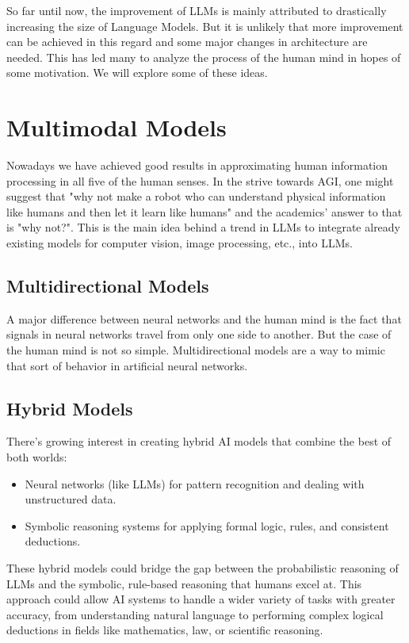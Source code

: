 So far until now, the improvement of LLMs is mainly attributed to drastically increasing the size of Language Models. But it is unlikely that more improvement can be achieved in this regard and some major changes in architecture are needed. This has led many to analyze the process of the human mind in hopes of some motivation. We will explore some of these ideas.

\section{Multimodal Models}
Nowadays we have achieved good results in approximating human information processing in all five of the human senses. In the strive towards AGI, one might suggest that "why not make a robot who can understand physical information like humans and then let it learn like humans" and the academics' answer to that is "why not?". This is the main idea behind a trend in LLMs to integrate already existing models for computer vision, image processing, etc., into LLMs.

\subsection*{Multidirectional Models}
A major difference between neural networks and the human mind is the fact that signals in neural networks travel from only one side to another. But the case of the human mind is not so simple. Multidirectional models are a way to mimic that sort of behavior in artificial neural networks.

\subsection*{Hybrid Models}
There’s growing interest in creating hybrid AI models that combine the best of both worlds:
\begin{itemize}
    \item Neural networks (like LLMs) for pattern recognition and dealing with unstructured data.
    \item Symbolic reasoning systems for applying formal logic, rules, and consistent deductions.
\end{itemize}
These hybrid models could bridge the gap between the probabilistic reasoning of LLMs and the symbolic, rule-based reasoning that humans excel at. This approach could allow AI systems to handle a wider variety of tasks with greater accuracy, from understanding natural language to performing complex logical deductions in fields like mathematics, law, or scientific reasoning.

%


